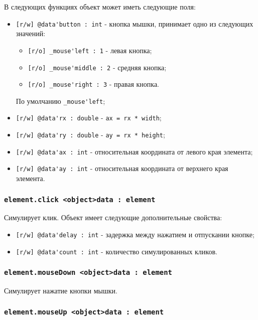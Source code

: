 \documentclass[a4paper, 14pt]{extarticle}
\newenvironment{icItems}
	{ \begin{itemize} [noitemsep,nolistsep] }
	{ \end{itemize} }
\begin{document}
В следующих функциях объект  может иметь следующие поля:
\begin{icItems}
	\item \lstinline|[r/w] @data'button : int| - кнопка мышки, принимает одно из следующих значений:
	\begin{icItems}
		\item \lstinline|[r/o] _mouse'left : 1| - левая кнопка;
		\item \lstinline|[r/o] _mouse'middle : 2| - средняя кнопка;
		\item \lstinline|[r/o] _mouse'right : 3| - правая кнопка.
	\end{icItems}
	По умолчанию \lstinline|_mouse'left|;
	\item \lstinline|[r/w] @data'rx : double| - \lstinline|ax = rx * width|;
	\item \lstinline|[r/w] @data'ry : double| - \lstinline|ay = rx * height|;
	\item \lstinline|[r/w] @data'ax : int| - относительная координата от левого края элемента;
	\item \lstinline|[r/w] @data'ay : int| - относительная координата от верхнего края элемента.
\end{icItems}

\subsubsection{\lstinline|element.click <object>data : element|}

Симулирует клик. Объект  имеет следующие дополнительные свойства:
\begin{icItems}
	\item \lstinline|[r/w] @data'delay : int| - задержка между нажатием и отпускании кнопке;
	\item \lstinline|[r/w] @data'count : int| - количество симулированных кликов.
\end{icItems}

\subsubsection{\lstinline|element.mouseDown <object>data : element|}

Симулирует нажатие кнопки мышки.

\subsubsection{\lstinline|element.mouseUp <object>data : element|}
\end{document}
